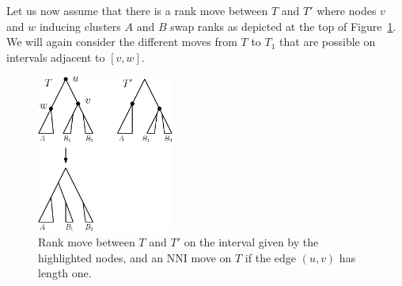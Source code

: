 \documentclass{amsart}
\newcommand{\nni}{\mathrm{NNI}}
\begin{document}
Let us now assume that there is a rank move between $T$ and $T'$ where nodes $v$ and $w$ inducing clusters $A$ and $B$ swap ranks as depicted at the top of Figure~\ref{fig:thm_fp_rank1}.
We will again consider the different moves from $T$ to $T_1$ that are possible on intervals adjacent to $[v,w]$.

\begin{figure}[!hbt]
\centering
\includegraphics[width=0.4\textwidth]{thm_fp_rank1}
\vspace{12pt}
\caption{Rank move between $T$ and $T'$ on the interval given by the highlighted nodes, and an $\nni$ move on $T$ if the edge $(u,v)$ has length one.}
\label{fig:thm_fp_rank1}
\end{figure}
\end{document}
